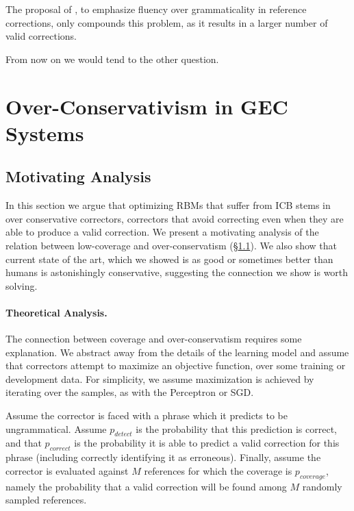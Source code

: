 \documentclass[a4paper, 11pt]{article}
\begin{document}
The proposal of , to emphasize fluency over grammaticality in reference corrections, only compounds this problem, as it results in a larger number of valid corrections.

From now on we would tend to the other question.

\vspace{-.1cm}
\section{Over-Conservativism in GEC Systems}\label{sec:formal_conservatism}
\vspace{-.1cm}
\subsection{Motivating Analysis}\label{subsec:motivating_analysis}
%
In this section we argue that optimizing RBMs that suffer from ICB stems
in over conservative correctors, correctors that avoid correcting even when they are able to produce a valid correction.
We present a motivating analysis of the relation between low-coverage and over-conservatism (\S \ref{subsec:motivating_analysis}). We also show that current state of the art, which we showed is as good or sometimes better than humans is astonishingly conservative, suggesting the connection we show is worth solving.

\paragraph{Theoretical Analysis.}
The connection between coverage and over-conservatism requires some explanation.
We abstract away from the details of the learning model and assume that correctors attempt to maximize an objective function, 
over some training or development data. For simplicity, we assume maximization is achieved by iterating over the samples, as with the Perceptron or SGD.

Assume the corrector is faced with a phrase which it predicts to be ungrammatical. 
Assume $p_{detect}$ is the probability that this prediction is correct, and that
$p_{correct}$ is the probability it is able to predict
a valid correction for this phrase (including correctly identifying it as erroneous).
Finally, assume the corrector is evaluated
against $M$ references for which the coverage is $p_{coverage}$,
namely the probability that
a valid correction will be found among $M$ randomly sampled references.
\end{document}

